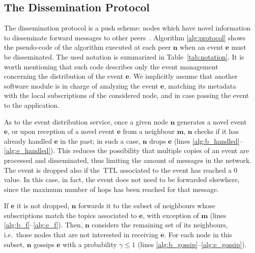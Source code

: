 \documentclass[10pt, conference, compsocconf]{IEEEtran}
\begin{document}
\subsection{The Dissemination Protocol}

The dissemination protocol
is a push scheme: nodes which have novel information to disseminate forward messages to other peers~\cite{disio11,disio10}. 
Algorithm \ref{alg:protocol} shows the pseudo-code of the algorithm executed at each peer $\mathbf{n}$ when an event $\mathbf{e}$ must be disseminated. The used notation is summarized in Table~\ref{tab:notation}.
It is worth mentioning that such code describes only the event management concerning the distribution of the event $\mathbf{e}$. We implicitly assume that another software module is in charge of analyzing the event $\mathbf{e}$, matching its metadata with the local subscriptions of the considered node, and in case passing the event to the application.

As to the event distribution service, once a given node $\mathbf{n}$ generates a novel event $\mathbf{e}$, or upon reception of a novel event $\mathbf{e}$ from a neighbour $\mathbf{m}$, $\mathbf{n}$ checks if it has already handled $\mathbf{e}$ in the past; in such a case, $\mathbf{n}$ drops $\mathbf{e}$ (lines \ref{alg:b_handled}--\ref{alg:e_handled}). This reduces the possibility that multiple copies of an event are processed and disseminated, thus limiting the amount of messages in the network.
The event is dropped also if the~\ac{TTL} associated to the event has reached a $0$ value. In this case, in fact, the event does not need to be forwarded elsewhere, since the maximum number of hops has been reached for that message. 

If $\mathbf{e}$ it is not dropped, $\mathbf{n}$ forwards it to the subset of neighbours 
whose subscriptions match the topics associated to $\mathbf{e}$, with exception of $\mathbf{m}$ (lines \ref{alg:b_f}--\ref{alg:e_f}).
Then, $\mathbf{n}$ considers the remaining set of its neighbours, i.e.~those nodes that are not interested in receiving $\mathbf{e}$.
For each node in this subset, $\mathbf{n}$ gossips $\mathbf{e}$ with a probability $\gamma \leq 1$ (lines \ref{alg:b_gossip}--\ref{alg:e_gossip}).
\end{document}
